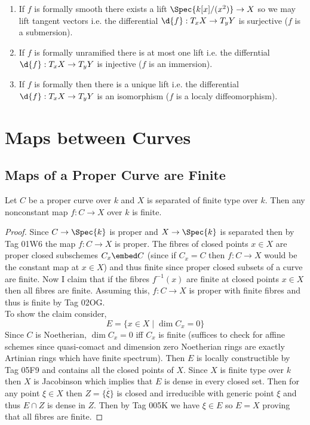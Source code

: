 \documentclass[12pt]{article}
\begin{document}
\begin{enumerate}
\item If $f$ is formally smooth there exists a lift $\Spec{k[x]/(x^2)} \to X$ so we may lift tangent vectors i.e. the differential $\d{f} : T_x X \to T_y Y$ is surjective ($f$ is a submersion).

\item If $f$ is formally unramified there is at most one lift i.e. the differntial $\d{f} : T_x X \to T_y Y$ is injective ($f$ is an immersion).

\item If $f$ is formally \etale then there is a unique lift i.e. the differential $\d{f} : T_x X \to T_y Y$ is an isomorphism ($f$ is a localy diffeomorphism). 
\end{enumerate}

\section{Maps between Curves}


\subsection{Maps of a Proper Curve are Finite}

\begin{theorem}
Let $C$ be a proper curve over $k$ and $X$ is separated of finite type over $k$. Then any nonconstant map $f : C \to X$ over $k$ is finite.
\end{theorem}

\begin{proof}
Since $C \to \Spec{k}$ is proper and $X \to \Spec{k}$ is separated then by Tag 01W6 the map $f : C \to X$ is proper. The fibres of closed points $x \in X$ are proper closed subschemes $C_x \embed C$ (since if $C_x = C$ then $f : C \to X$ would be the constant map at $x \in X$) and thus finite since proper closed subsets of a curve are finite. Now I claim that if the fibres $f^{-1}(x)$ are finite at closed points $x \in X$ then all fibres are finite. Assuming this, $f : C \to X$ is proper with finite fibres and thus is finite by Tag 02OG.
\bigskip\\
To show the claim consider,
\[ E = \{ x \in X \mid \dim{C_x} = 0 \} \]   
Since $C$ is Noetherian, $\dim{C_x} = 0$ iff $C_x$ is finite (suffices to check for affine schemes since quasi-comact and dimension zero Noetherian rings are exactly Artinian rings which have finite spectrum). Then $E$ is locally constructible by Tag 05F9 and contains all the closed points of $X$. Since $X$ is finite type over $k$ then $X$ is Jacobinson which implies that $E$ is dense in every closed set. Then for any point $\xi \in X$ then $Z = \overline{\{ \xi \}}$ is closed and irreducible with generic point $\xi$ and thus $E \cap Z$ is dense in $Z$. Then by Tag 005K we have $\xi \in E$ so $E = X$ proving that all fibres are finite.
\end{proof}
\end{document}
